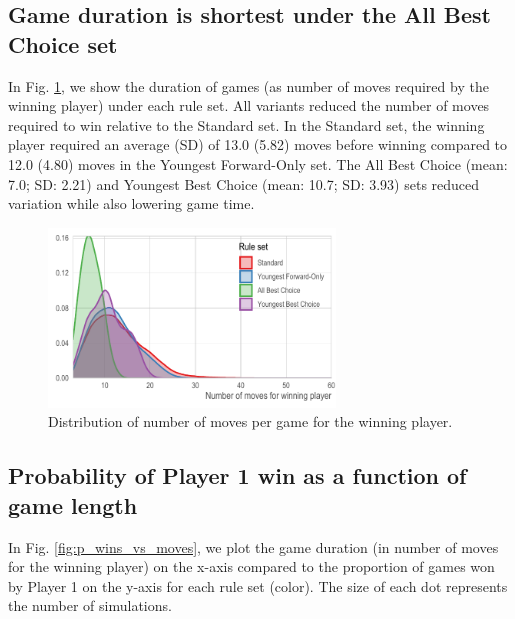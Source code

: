 \documentclass[letterpaper,9pt,twocolumn,twoside,]{pinp}
\begin{document}
\hypertarget{game-duration-is-shortest-under-the-all-best-choice-set}{%
\subsection{Game duration is shortest under the All Best Choice
set}\label{game-duration-is-shortest-under-the-all-best-choice-set}}

In Fig. \ref{fig:p_winning_dist}, we show the duration of games (as
number of moves required by the winning player) under each rule set. All
variants reduced the number of moves required to win relative to the
Standard set. In the Standard set, the winning player required an
average (SD) of 13.0 (5.82) moves before winning compared to 12.0 (4.80)
moves in the Youngest Forward-Only set. The All Best Choice (mean: 7.0;
SD: 2.21) and Youngest Best Choice (mean: 10.7; SD: 3.93) sets reduced
variation while also lowering game time.

\begin{figure}
  \begin{center}
    \includegraphics[width=3in]{./../../plots/p_winning_dist.pdf}
    \caption{Distribution of number of moves per game for the winning player.}
    \label{fig:p_winning_dist}
  \end{center}
\end{figure}

\hypertarget{probability-of-player-1-win-as-a-function-of-game-length}{%
\subsection{Probability of Player 1 win as a function of game
length}\label{probability-of-player-1-win-as-a-function-of-game-length}}

In Fig. \ref{fig:p_wins_vs_moves}, we plot the game duration (in number
of moves for the winning player) on the x-axis compared to the
proportion of games won by Player 1 on the y-axis for each rule set
(color). The size of each dot represents the number of simulations.
\end{document}
